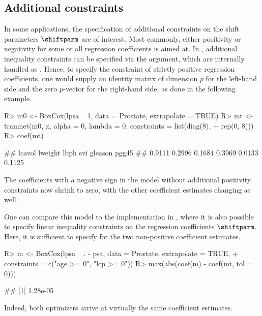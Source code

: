 \subsection{Additional constraints} \label{subsec:otherconstr}

In some applications, the specification of additional constraints on the shift
parameters $\shiftparm$ are of interest. Most commonly, either positivity or
negativity for some or all regression coefficients is aimed at. In ,
additional inequality constraints can be specified via the  argument,
which are internally handled as . 
Hence, to specify the constraint of strictly positive regression coefficients, 
one would supply an identity matrix of dimension $p$ for the left-hand side and
the zero $p$-vector for the right-hand side, as done in the following example.
\begin{example}
R> m0 <- BoxCox(lpsa ~ 1, data = Prostate, extrapolate = TRUE)
R> mt <- tramnet(m0, x, alpha = 0, lambda = 0, constraints = list(diag(8),
+                                                                 rep(0, 8)))
R> coef(mt)

## lcavol lweight    lbph     svi gleason   pgg45 
## 0.9111  0.2996  0.1684  0.3969  0.0133  0.1125 
\end{example}
The coefficients with a negative sign in the model without additional positivity
constraints now shrink to zero, with the other coefficient estimates changing
as well.
One can compare this model to the implementation in , where it is also
possible to specify linear inequality constraints on the regression coefficients
$\shiftparm$. Here, it is sufficient to specify
for the two non-positive coefficient estimates.
\begin{example}
R> m <- BoxCox(lpsa ~ . - psa, data = Prostate, extrapolate = TRUE,
+              constraints = c("age >= 0", "lcp >= 0"))
R> max(abs(coef(m) - coef(mt, tol = 0)))

## [1] 1.28e-05
\end{example}
Indeed, both optimizers arrive at virtually the same coefficient estimates.

